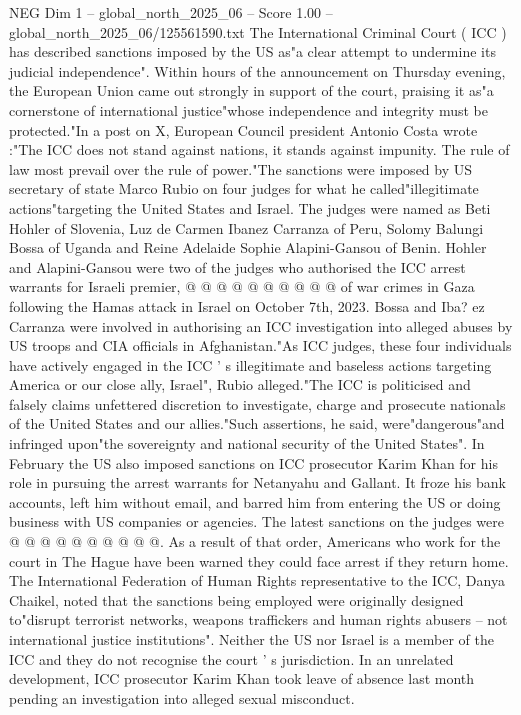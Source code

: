\begin{textsample}{NEG Dim 1 – global\_north\_2025\_06 – Score 1.00 – global\_north\_2025\_06/125561590.txt}  \label{ex:f1_neg_143}
The International Criminal Court ( ICC ) has described sanctions imposed by the US as"a clear attempt to undermine its judicial independence".
Within hours of the announcement on Thursday evening, the European Union came out strongly in support of the court, praising it as"a cornerstone of international justice"whose independence and integrity must be protected."In a post on X, European Council president Antonio Costa wrote :"The ICC does not stand against nations, it stands against impunity.
The rule of law most prevail over the rule of power."The sanctions were imposed by US secretary of state Marco Rubio on four judges for what he called"illegitimate actions"targeting the United States and Israel.
The judges were named as Beti Hohler of Slovenia, Luz de Carmen Ibanez Carranza of Peru, Solomy Balungi Bossa of Uganda and Reine Adelaide Sophie Alapini-Gansou of Benin.
Hohler and Alapini-Gansou were two of the judges who authorised the ICC arrest warrants for Israeli premier, @ @ @ @ @ @ @ @ @ @ of war crimes in Gaza following the Hamas attack in Israel on October 7th, 2023.
Bossa and Iba? ez Carranza were involved in authorising an ICC investigation into alleged abuses by US troops and CIA officials in Afghanistan."As ICC judges, these four individuals have actively engaged in the ICC ' s illegitimate and baseless actions targeting America or our close ally, Israel", Rubio alleged."The ICC is politicised and falsely claims unfettered discretion to investigate, charge and prosecute nationals of the United States and our allies."Such assertions, he said, were"dangerous"and infringed upon"the sovereignty and national security of the United States".
In February the US also imposed sanctions on ICC prosecutor Karim Khan for his role in pursuing the arrest warrants for Netanyahu and Gallant.
It froze his bank accounts, left him without email, and barred him from entering the US or doing business with US companies or agencies.
The latest sanctions on the judges were @ @ @ @ @ @ @ @ @ @.
As a result of that order, Americans who work for the court in The Hague have been warned they could face arrest if they return home.
The International Federation of Human Rights representative to the ICC, Danya Chaikel, noted that the sanctions being employed were originally designed to"disrupt terrorist networks, weapons traffickers and human rights abusers -- not international justice institutions".
Neither the US nor Israel is a member of the ICC and they do not recognise the court ' s jurisdiction.
In an unrelated development, ICC prosecutor Karim Khan took leave of absence last month pending an investigation into alleged sexual misconduct.

\end{textsample}

